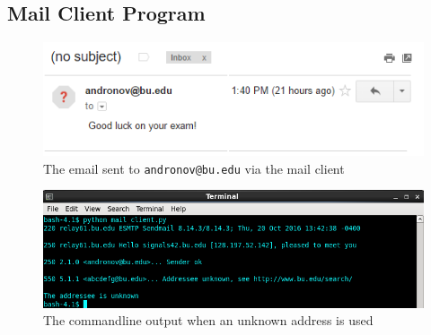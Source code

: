 \documentclass[12pt]{article}
\begin{document}
\subsection{Mail Client Program}

	\begin{figure}[h]
		\caption{The email sent to \texttt{andronov@bu.edu} via the mail client}
		\centering
		\includegraphics[width=\textwidth,height=\textheight,keepaspectratio,scale=0.5=0.5]{self_mail}
	\end{figure}

	\begin{figure}[h]
		\caption{The commandline output when an unknown address is used}
		\centering
		\includegraphics[width=\textwidth,height=\textheight,keepaspectratio,scale=0.5=0.5]{addr_unknown}
	\end{figure}
\end{document}
